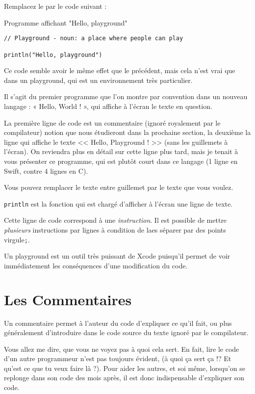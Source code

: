 Remplacez le par le code suivant :
\begin{listing}[h]
\caption{Programme affichant "Hello, playground"}
\begin{verbatim}
// Playground - noun: a place where people can play

println("Hello, playground")
\end{verbatim}
\end{listing}

Ce code semble avoir le même effet que le précédent, mais cela n'est vrai que dans un playground, qui est un environnement très particulier.

Il s’agit du premier programme que l’on montre par convention dans un nouveau langage :
« Hello, World ! », qui affiche à l’écran le texte en question.

La première ligne de code est un commentaire (ignoré royalement par le compilateur)
notion que nous étudieront dans la prochaine section, la deuxième la ligne qui affiche le
texte << Hello, Playground ! >> (sans les guillemets à l’écran).
On reviendra plus en détail sur cette ligne plus tard, mais je tenait à vous présenter ce
programme, qui est plutôt court dans ce langage (1 ligne en Swift, contre 4 lignes en C).

Vous pouvez remplacer le texte entre guillemet par le texte que vous voulez.

\texttt{println} est la fonction qui est chargé d’afficher à l’écran une ligne de texte.

Cette ligne de code correspond à une \emph{instruction}.
Il est possible de mettre \emph{plusieurs} instructions par lignes à condition de laes séparer par des points virgule\verb";".

Un playground est un outil très puissant de Xcode puisqu’il permet de voir immédiatement
les conséquences d’une modification du code.
\section{Les Commentaires}
Un commentaire permet à l’auteur du code d’expliquer ce qu’il fait, ou plus généralement
d’introduire dans le code source du texte ignoré par le compilateur.

Vous allez me dire, que vous ne voyez pas à quoi cela sert. En fait, lire le code d’un autre
programmeur n’est pas toujours évident, (à quoi ça sert ça !? Et qu’est ce que tu veux faire
là ?). Pour aider les autres, et soi même, lorsqu’on se replonge dans son code des mois après, il est donc
indispensable d’expliquer son code.

